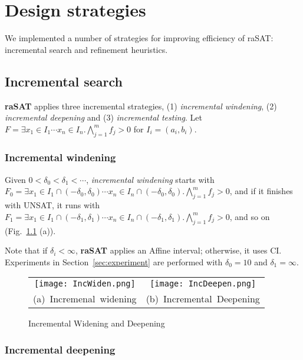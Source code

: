 \chapter{Design strategies}
We implemented a number of strategies for improving efficiency of raSAT: incremental search and refinement heuristics.
\section{Incremental search} \label{sec:incsearch}
{\bf raSAT} applies three incremental strategies, 
(1) {\em incremental windening}, (2) {\em incremental deepening} and (3) {\em incremental testing}. 
Let
$F = \exists x_1 \in I_1 \cdots x_n \in I_n. \bigwedge \limits_{j=1}^m f_j > 0$
for $I_i = (a_i,b_i)$. %

\subsection{Incremental windening}
Given $0 < \delta_0 < \delta_1 < \cdots$, 
{\em incremental windening} starts with 
$F_0 = \exists x_1 \in I_1 \cap (-\delta_0 , \delta_0) \cdots x_n \in I_n \cap (-\delta_0 , \delta_0). 
\bigwedge \limits_{j=1}^m f_j > 0$, 
and if it finishes with UNSAT, it runs with 
$F_1 = \exists x_1 \in I_1 \cap (-\delta_1 , \delta_1) \cdots x_n \in I_n \cap (-\delta_1 , \delta_1). 
\bigwedge \limits_{j=1}^m f_j > 0$, and so on (Fig.~\ref{fig:incwid} (a)). 

Note that if $\delta_i < \infty$, {\bf raSAT} applies an Affine interval; otherwise, 
it uses CI. 
Experiments in Section~\ref{sec:experiment} are performed 
with $\delta_0 = 10$ and $\delta_1 = \infty$.
\begin{figure}[ht]
\begin{minipage}[b]{1.0\linewidth}
\centering
\begin{tabular}{c@{\qquad}c}
\texttt{[image: IncWiden.png]} &
\texttt{[image: IncDeepen.png]} \\
\mbox{(a) Incremenal widening} & \mbox{(b) Incremental Deepening} \\
\end{tabular}
\caption{Incremental Widening and Deepening}
\label{fig:incwid}
\end{minipage}
\end{figure}


\subsection{Incremental deepening}

